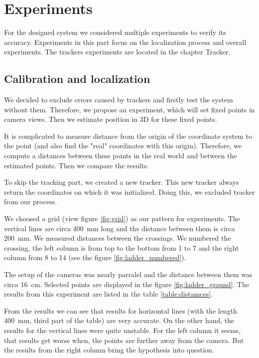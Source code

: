 \chapter{Experiments} 

For the designed system we considered multiple experiments to
verify its accuracy. Experiments in this part focus on the localization process
and overall experiments. The trackers experiments are located in the chapter
Tracker.

\section{Calibration and localization}

We decided to exclude errors caused by trackers and firstly test the system
without them. Therefore, we propose an experiment, which will set fixed points
in camera views. Then we estimate position in 3D for these fixed points.

It is complicated to measure distance from the origin of the coordinate system
to the point (and also find the "real" coordinates with this origin).
Therefore, we compute a distances between these points in the real world and
between the estimated points. Then we compare the results.
 
To skip the tracking part, we created a new tracker. This new tracker always
return the coordinates on which it was initialized. Doing this, we excluded
tracker from our process.

We choosed a grid (view figure \ref{fig:grid}) as our pattern for experiments.
The vertical lines are circa 400~mm long and the distance between them is circa
200~mm. We measured distances between the crossings. We numbered the crossing,
the left column is from top to the bottom from 1 to 7 and the right column from
8 to 14 (see the figure \ref{fig:ladder_numbered}).

The setup of the cameras was nearly parralel and the distance between them was
circa 16~cm. Selected points are displayed in the figure \ref{fig:ladder_ground}. The
results from this experiment are listed in the table \ref{table:distamces}. 

From the results we can see that results for horizontal lines (with the length
400~mm, third part of the table) are very accurate. On the other hand, the
results for the vertical lines were quite unstable. For the left column it
seems, that results get worse when, the points are further away from the
camera. But the results from the right column bring the hypothesis into
question. 

